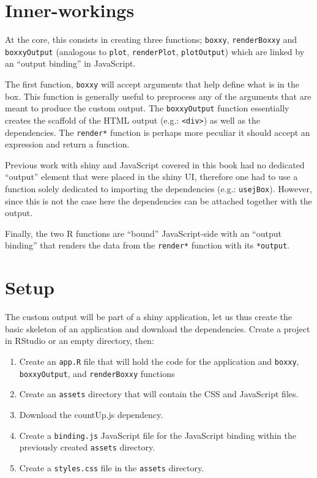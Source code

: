 \documentclass[
]{krantz}
\providecommand{\tightlist}{%
  \setlength{\itemsep}{0pt}\setlength{\parskip}{0pt}}
\begin{document}
\hypertarget{shiny-output-inner-workings}{%
\section{Inner-workings}\label{shiny-output-inner-workings}}

At the core, this consists in creating three functions; \texttt{boxxy}, \texttt{renderBoxxy} and \texttt{boxxyOutput} (analogous to \texttt{plot}, \texttt{renderPlot}, \texttt{plotOutput}) which are linked by an ``output binding'' in JavaScript.

The first function, \texttt{boxxy} will accept arguments that help define what is in the box. This function is generally useful to preprocess any of the arguments that are meant to produce the custom output. The \texttt{boxxyOutput} function essentially creates the scaffold of the HTML output (e.g.: \texttt{\textless{}div\textgreater{}}) as well as the dependencies. The \texttt{render*} function is perhaps more peculiar it should accept an expression and return a function.

Previous work with shiny and JavaScript covered in this book had no dedicated ``output'' element that were placed in the shiny UI, therefore one had to use a function solely dedicated to importing the dependencies (e.g.: \texttt{usejBox}). However, since this is not the case here the dependencies can be attached together with the output.

Finally, the two R functions are ``bound'' JavaScript-side with an ``output binding'' that renders the data from the \texttt{render*} function with its \texttt{*output}.

\hypertarget{shiny-output-setup}{%
\section{Setup}\label{shiny-output-setup}}

The custom output will be part of a shiny application, let us thus create the basic skeleton of an application and download the dependencies. Create a project in RStudio or an empty directory, then:

\begin{enumerate}
\def\labelenumi{\arabic{enumi}.}
\tightlist
\item
  Create an \texttt{app.R} file that will hold the code for the application and \texttt{boxxy}, \texttt{boxxyOutput}, and \texttt{renderBoxxy} functions
\item
  Create an \texttt{assets} directory that will contain the CSS and JavaScript files.
\item
  Download the countUp.js dependency.
\item
  Create a \texttt{binding.js} JavaScript file for the JavaScript binding within the previously created \texttt{assets} directory.
\item
  Create a \texttt{styles.css} file in the \texttt{assets} directory.
\end{enumerate}
\end{document}
